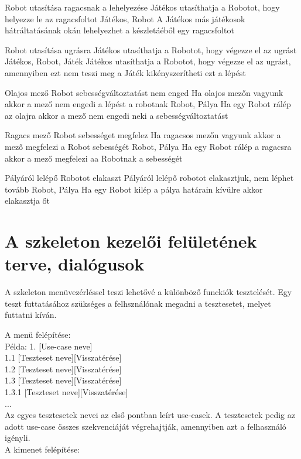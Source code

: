\usecase%
{Robot utasítása ragacsnak a lehelyezése}%
{Játékos utasíthatja a Robotot, hogy helyezze le az ragacsfoltot}%
{Játékos, Robot}%
{A Játékos más játékosok hátráltatásának okán lehelyezhet a készletáéből egy ragacsfoltot}

\usecase%
{Robot utasítása ugrásra}%
{Játékos utasíthatja a Robotot, hogy végezze el az ugrást}%
{Játékos, Robot, Játék}%
{Játékos utasíthatja a Robotot, hogy végezze el az ugrást, amennyiben ezt nem teszi meg a Játék kikényszerítheti ezt a lépést}

\usecase%
{Olajos mező Robot sebességváltoztatást nem enged}%
{Ha olajos mezőn vagyunk akkor a mező nem engedi a lépést a robotnak}%
{Robot, Pálya}%
{Ha egy Robot rálép az olajra akkor a mező nem engedi neki a sebességváltoztatást}

\usecase%
{Ragacs mező Robot sebességet megfelez}%
{Ha ragacsos mezőn vagyunk akkor a mező megfelezi a Robot sebességét}%
{Robot, Pálya}%
{Ha egy Robot rálép a ragacsra akkor a mező megfelezi aa Robotnak a sebességét}

\usecase%
{Pályáról lelépő Robotot elakaszt}%
{Pályáról lelépő robotot elakasztjuk, nem léphet tovább}%
{Robot, Pálya}%
{Ha egy Robot kilép a pálya határain kívülre akkor elakasztja őt}

\section{A szkeleton kezelői felületének terve, dialógusok}
A szkeleton menüvezérléssel teszi lehetővé a különböző funckiók tesztelését. Egy teszt futtatásához szükséges a felhsználónak
megadni a tesztesetet, melyet futtatni kíván. 

A menü felépítése: \\

Példa:
1. [Use-case neve] \\
1.1 [Teszteset neve][Visszatérése] \\
1.2 [Teszteset neve][Visszatérése] \\
1.3 [Teszteset neve][Visszatérése] \\
   1.3.1 [Teszteset neve][Visszatérése] \\
... \\

Az egyes tesztesetek nevei az első pontban leírt use-casek. A tesztesetek pedig
az adott use-case összes szekvenciáját végrehajtják, amennyiben azt a felhasználó igényli. \\

A kimenet felépítése: \\

